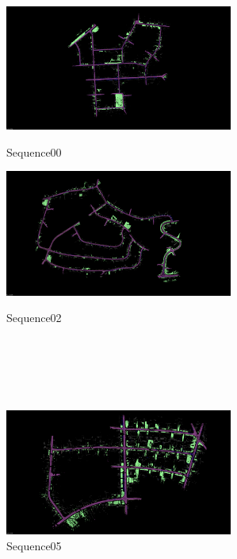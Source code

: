 \begin{figure}[htbp]
 \begin{minipage}{0.5\hsize}
  \begin{center}
   \includegraphics[width=75mm]{./picture/sequence00_map.png}
  \end{center}
  \caption{Sequence00}
  \label{fig:sequence00}
 \end{minipage}
 \begin{minipage}{0.5\hsize}
  \begin{center}
   \includegraphics[width=75mm]{./picture/sequence02_map.png}
  \end{center}
  \caption{Sequence02}
  \label{fig:sequence02}
 \end{minipage} \\ \\ \\ \\
  \begin{minipage}{0.5\hsize}
  \begin{center}
   \includegraphics[width=75mm]{./picture/sequence05_map.png}
  \end{center}
  \caption{Sequence05}
  \label{fig:sequence05}
 \end{minipage}
 \begin{minipage}{0.5\hsize}

\end{minipage}
\end{figure}
